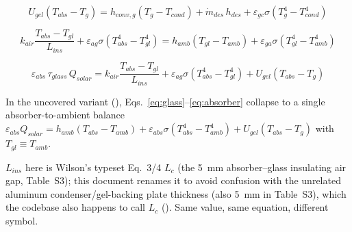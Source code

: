 \documentclass[11pt]{article}
\newcommand{\code}[1]{\texttt{\seqsplit{#1}}}
\begin{document}
\begin{equation}
U_{gel}(T_{abs} - T_g)
= h_{conv,g}(T_g - T_{cond})
+ \dot{m}_{des}\,h_{des}
+ \varepsilon_{gc}\sigma(T_g^4 - T_{cond}^4)
\label{eq:gel}
\end{equation}

\begin{equation}
k_{air}\frac{T_{abs} - T_{gl}}{L_{ins}}
+ \varepsilon_{ag}\sigma(T_{abs}^4 - T_{gl}^4)
= h_{amb}(T_{gl} - T_{amb})
+ \varepsilon_{ga}\sigma(T_{gl}^4 - T_{amb}^4)
\label{eq:glass}
\end{equation}

\begin{equation}
\varepsilon_{abs}\,\tau_{glass}\,Q_{solar}
= k_{air}\frac{T_{abs} - T_{gl}}{L_{ins}}
+ \varepsilon_{ag}\sigma(T_{abs}^4 - T_{gl}^4)
+ U_{gel}(T_{abs} - T_g)
\label{eq:absorber}
\end{equation}

In the uncovered variant (\code{has\_glass=False}), Eqs.~\eqref{eq:glass}--\eqref{eq:absorber}
collapse to a single absorber-to-ambient balance $\varepsilon_{abs}Q_{solar} =
h_{amb}(T_{abs}-T_{amb}) + \varepsilon_{abs}\sigma(T_{abs}^4 - T_{amb}^4) + U_{gel}(T_{abs}-T_g)$
with $T_{gl} \equiv T_{amb}$.

$L_{ins}$ here is Wilson's typeset Eq.~3/4 $L_c$ (the 5~mm absorber--glass insulating air gap,
Table~S3); this document renames it to avoid confusion with the unrelated aluminum condenser/gel-backing
plate thickness (also 5~mm in Table~S3), which the codebase also happens to call $L_c$ (\code{L\_C\_M}).
Same value, same equation, different symbol.
\end{document}
